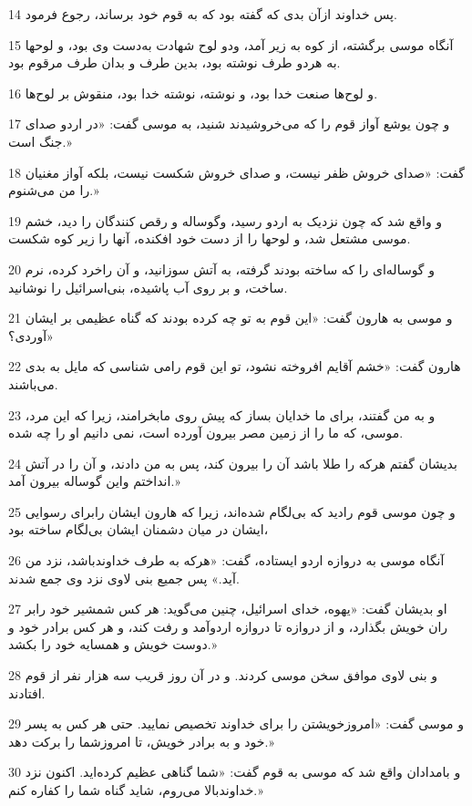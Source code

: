 \par 14 پس خداوند ازآن بدی که گفته بود که به قوم خود برساند، رجوع فرمود.
\par 15 آنگاه موسی برگشته، از کوه به زیر آمد، ودو لوح شهادت به‌دست وی بود، و لوحها به هردو طرف نوشته بود، بدین طرف و بدان طرف مرقوم بود.
\par 16 و لوح‌ها صنعت خدا بود، و نوشته، نوشته خدا بود، منقوش بر لوح‌ها.
\par 17 و چون یوشع آواز قوم را که می‌خروشیدند شنید، به موسی گفت: «در اردو صدای جنگ است.»
\par 18 گفت: «صدای خروش ظفر نیست، و صدای خروش شکست نیست، بلکه آواز مغنیان را من می‌شنوم.»
\par 19 و واقع شد که چون نزدیک به اردو رسید، وگوساله و رقص کنندگان را دید، خشم موسی مشتعل شد، و لوحها را از دست خود افکنده، آنها را زیر کوه شکست.
\par 20 و گوساله‌ای را که ساخته بودند گرفته، به آتش سوزانید، و آن راخرد کرده، نرم ساخت، و بر روی آب پاشیده، بنی‌اسرائیل را نوشانید.
\par 21 و موسی به هارون گفت: «این قوم به تو چه کرده بودند که گناه عظیمی بر ایشان آوردی؟»
\par 22 هارون گفت: «خشم آقایم افروخته نشود، تو این قوم رامی شناسی که مایل به بدی می‌باشند.
\par 23 و به من گفتند، برای ما خدایان بساز که پیش روی مابخرامند، زیرا که این مرد، موسی، که ما را از زمین مصر بیرون آورده است، نمی دانیم او را چه شده.
\par 24 بدیشان گفتم هر‌که را طلا باشد آن را بیرون کند، پس به من دادند، و آن را در آتش انداختم واین گوساله بیرون آمد.»
\par 25 و چون موسی قوم رادید که بی‌لگام شده‌اند، زیرا که هارون ایشان رابرای رسوایی ایشان در میان دشمنان ایشان بی‌لگام ساخته بود،
\par 26 آنگاه موسی به دروازه اردو ایستاده، گفت: «هر‌که به طرف خداوندباشد، نزد من آید.» پس جمیع بنی لاوی نزد وی جمع شدند.
\par 27 او بدیشان گفت: «یهوه، خدای اسرائیل، چنین می‌گوید: هر کس شمشیر خود رابر ران خویش بگذارد، و از دروازه تا دروازه اردوآمد و رفت کند، و هر کس برادر خود و دوست خویش و همسایه خود را بکشد.»
\par 28 و بنی لاوی موافق سخن موسی کردند. و در آن روز قریب سه هزار نفر از قوم افتادند.
\par 29 و موسی گفت: «امروزخویشتن را برای خداوند تخصیص نمایید. حتی هر کس به پسر خود و به برادر خویش، تا امروزشما را برکت دهد.»
\par 30 و بامدادان واقع شد که موسی به قوم گفت: «شما گناهی عظیم کرده‌اید. اکنون نزد خداوندبالا می‌روم، شاید گناه شما را کفاره کنم.»
